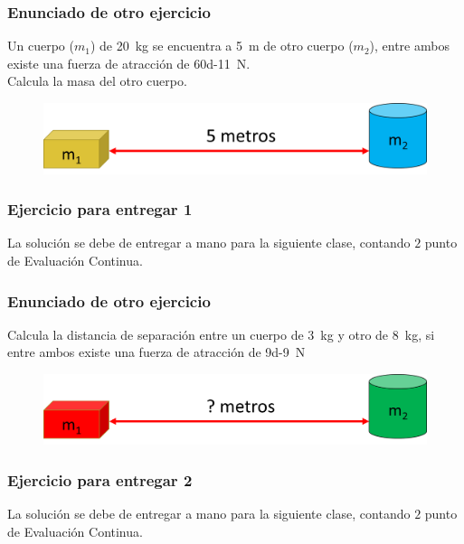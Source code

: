 \documentclass[14pt]{beamer}
\begin{document}
\begin{frame}
\frametitle{Enunciado de otro ejercicio}
Un cuerpo ($m_{1}$) de \SI{20}{\kilogram} se encuentra a \SI{5}{\meter} de otro cuerpo ($m_{2}$), entre ambos existe una fuerza de atracción de \SI{60d-11}{\newton}.
\\
\bigskip
\pause
Calcula la masa del otro cuerpo.
\begin{figure}
    \centering
    \includegraphics[scale=0.75]{Imagenes/Gravitacion_Universal_02.png}
\end{figure}
\end{frame}
\begin{frame}
\frametitle{Ejercicio para entregar 1}
La solución se debe de entregar a mano para la siguiente clase, contando $2$ punto de Evaluación Continua.
\end{frame}
\begin{frame}
\frametitle{Enunciado de otro ejercicio}
Calcula la distancia de separación entre un cuerpo de \SI{3}{\kilo\gram} y otro de \SI{8}{\kilo\gram}, si entre ambos existe una fuerza de atracción de \SI{9d-9}{\newton}
\begin{figure}
    \centering
    \includegraphics[scale=0.75]{Imagenes/Gravitacion_Universal_03.png}
\end{figure}
\end{frame}
\begin{frame}
\frametitle{Ejercicio para entregar 2}
La solución se debe de entregar a mano para la siguiente clase, contando $2$ punto de Evaluación Continua.
\end{frame}    

    
\end{document}
